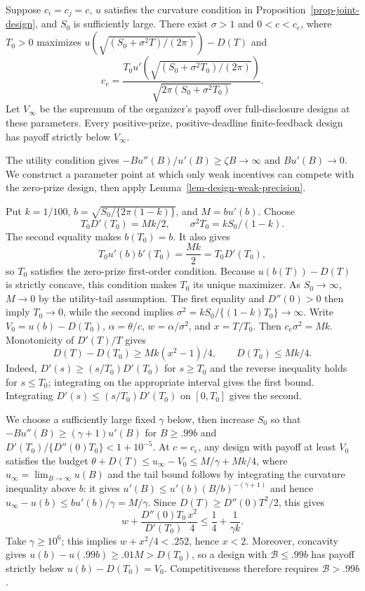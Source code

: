 \documentclass[mnsc]{informs3}
\begin{document}
\begin{APPENDICES}
{\begin{lemma}\label{lem-design-output-bound}
Suppose $c_i=c_j=c$, $u$ satisfies the curvature condition in
Proposition~\ref{prop-joint-design}, and $S_0$ is sufficiently large.
There exist $\sigma>1$ and $0<c<c_e$, where $T_0>0$ maximizes
$u(\sqrt{(S_0+\sigma^2T)/(2\pi)})-D(T)$ and
\[
c_e=\frac{T_0u'(\sqrt{(S_0+\sigma^2T_0)/(2\pi)})}
{\sqrt{2\pi(S_0+\sigma^2T_0)}}.
\]
Let $V_\infty$ be the supremum of the organizer's payoff over
full-disclosure designs at these parameters.
Every positive-prize, positive-deadline finite-feedback design has
payoff strictly below $V_\infty$.
\end{lemma}

The utility condition gives $-Bu''(B)/u'(B)\geq\zeta B\to\infty$
and $Bu'(B)\to0$.
We construct a parameter point at which only weak incentives can compete
with the zero-prize design, then apply Lemma~\ref{lem-design-weak-precision}.

Put $k=1/100$, $b=\sqrt{S_0/\{2\pi(1-k)\}}$, and $M=bu'(b)$.
Choose
\[
T_0D'(T_0)=Mk/2,\qquad \sigma^2T_0=kS_0/(1-k).
\]
The second equality makes $b(T_0)=b$. It also gives
\[
T_0u'(b)b'(T_0)=\frac{Mk}{2}=T_0D'(T_0),
\]
so $T_0$ satisfies the zero-prize first-order condition. Because
$u(b(T))-D(T)$ is strictly concave, this condition makes $T_0$ its unique
maximizer. As $S_0\to\infty$, $M\to0$ by the utility-tail assumption.
The first equality and $D''(0)>0$ then imply $T_0\to0$, while the second
implies $\sigma^2=kS_0/\{(1-k)T_0\}\to\infty$.
Write $V_0=u(b)-D(T_0)$, $\alpha=\theta/c$,
$w=\alpha/\sigma^2$, and $x=T/T_0$. Then $c_e\sigma^2=Mk$.
Monotonicity of $D'(T)/T$ gives
\[
D(T)-D(T_0)\geq Mk(x^2-1)/4,\qquad D(T_0)\leq Mk/4.
\]
Indeed, $D'(s)\geq(s/T_0)D'(T_0)$ for $s\geq T_0$ and the reverse
inequality holds for $s\leq T_0$; integrating on the appropriate interval
gives the first bound. Integrating
$D'(s)\leq(s/T_0)D'(T_0)$ on $[0,T_0]$ gives the second.

We choose a sufficiently large fixed $\gamma$ below, then increase $S_0$
so that $-Bu''(B)\geq(\gamma+1)u'(B)$ for $B\geq.99b$ and
$D'(T_0)/\{D''(0)T_0\}<1+10^{-5}$.
At $c=c_e$, any design with payoff at least $V_0$ satisfies
the budget $\theta+D(T)\leq u_\infty-V_0\leq M/\gamma+Mk/4$,
where $u_\infty=\lim_{B\to\infty}u(B)$ and the tail bound follows
by integrating the curvature inequality above $b$: it gives
$u'(B)\leq u'(b)(B/b)^{-(\gamma+1)}$ and hence
$u_\infty-u(b)\leq bu'(b)/\gamma=M/\gamma$. Since
$D(T)\geq D''(0)T^2/2$, this gives
\[
w+\frac{D''(0)T_0}{D'(T_0)}\frac{x^2}{4}
\leq\frac14+\frac1{\gamma k}.
\]
Take $\gamma\geq10^6$; this implies $w+x^2/4<.252$, hence $x<2$.
Moreover, concavity gives $u(b)-u(.99b)\geq.01M>D(T_0)$,
so a design with $\mathcal B\leq.99b$ has payoff strictly below
$u(b)-D(T_0)=V_0$. Competitiveness therefore requires
$\mathcal B>.99b$.

}
\end{APPENDICES}
\end{document}
